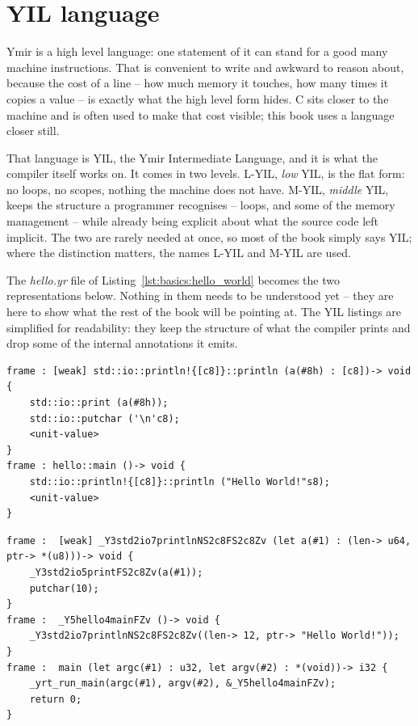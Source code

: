 \section{YIL language}
\label{sec:basics:yil_language}

Ymir is a high level language: one statement of it can stand for a good many
machine instructions. That is convenient to write and awkward to reason about,
because the cost of a line -- how much memory it touches, how many times it
copies a value -- is exactly what the high level form hides. C sits closer to the
machine and is often used to make that cost visible; this book uses a language
closer still.

That language is YIL, the Ymir Intermediate Language, and it is what the compiler
itself works on. It comes in two levels. L-YIL, \textit{low} YIL, is the flat
form: no loops, no scopes, nothing the machine does not have. M-YIL,
\textit{middle} YIL, keeps the structure a programmer recognises -- loops, and
some of the memory management -- while already being explicit about what the
source code left implicit. The two are rarely needed at once, so most of the book
simply says YIL; where the distinction matters, the names L-YIL and M-YIL are
used.

The \textit{hello.yr} file of Listing~\ref{lst:basics:hello_world} becomes the
two representations below. Nothing in them needs to be understood yet -- they are
here to show what the rest of the book will be pointing at. The YIL listings are
simplified for readability: they keep the structure of what the compiler prints
and drop some of the internal annotations it emits.

\begin{lstlisting}[style=myilVerb, caption=M-YIL representation of \textit{hello.yr}]
frame : [weak] std::io::println!{[c8]}::println (a(#8h) : [c8])-> void {
    std::io::print (a(#8h));
    std::io::putchar ('\n'c8);
    <unit-value>
}
frame : hello::main ()-> void {
    std::io::println!{[c8]}::println ("Hello World!"s8);
    <unit-value>
}
\end{lstlisting}

\begin{lstlisting}[style=lyilVerb, caption=L-YIL representation of \textit{hello.yr}]
frame :  [weak] _Y3std2io7printlnNS2c8FS2c8Zv (let a(#1) : (len-> u64, ptr-> *(u8)))-> void {
    _Y3std2io5printFS2c8Zv(a(#1));
    putchar(10);
}
frame :  _Y5hello4mainFZv ()-> void {
    _Y3std2io7printlnNS2c8FS2c8Zv((len-> 12, ptr-> "Hello World!"));
}
frame :  main (let argc(#1) : u32, let argv(#2) : *(void))-> i32 {
    _yrt_run_main(argc(#1), argv(#2), &_Y5hello4mainFZv);
    return 0;
}
\end{lstlisting}

